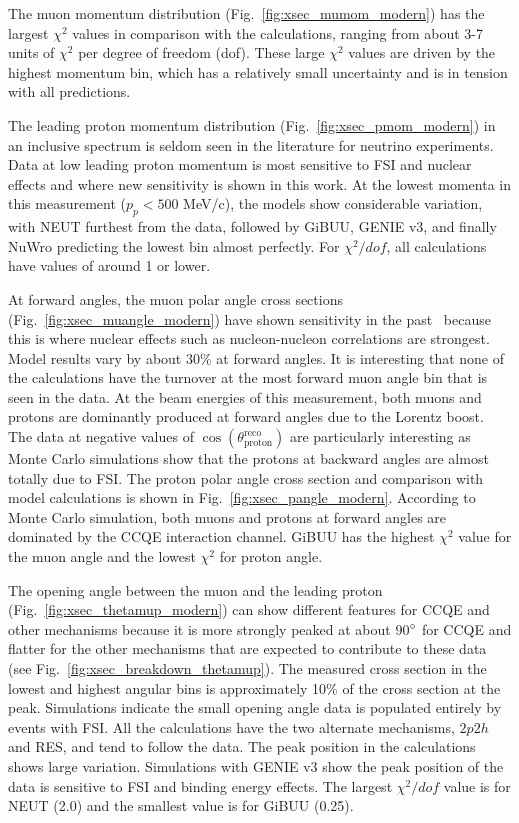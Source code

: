 \documentclass[%
twocolumn,
 amsmath,amssymb,
 aps,
prd,
superscriptaddress,showpacs]{revtex4-2}
\begin{document}
The muon momentum distribution (Fig.~\ref{fig:xsec_mumom_modern}) has the largest $\chi^2$ values in comparison with the calculations, ranging from about 3-7 units of $\chi^2$ per degree of freedom (dof).
These large $\chi^2$ values are driven by the highest momentum bin, which has a relatively small uncertainty and is in tension with all predictions.

The leading proton momentum distribution (Fig.~\ref{fig:xsec_pmom_modern}) in an inclusive spectrum is seldom seen in the literature for neutrino experiments.
Data at low leading proton momentum is most sensitive to FSI and nuclear effects and where new sensitivity is shown in this work.
At the lowest momenta in this measurement ($p_p<500$ MeV/c), the models show considerable variation, with NEUT furthest from the data, followed by GiBUU, GENIE v3, and finally NuWro predicting the lowest bin almost perfectly. 
For $\chi^2/dof$, all calculations have values of around 1 or lower.

At forward angles, the muon polar angle cross sections (Fig.~\ref{fig:xsec_muangle_modern}) have shown sensitivity in the past~\cite{Abe:2018pwo,Ruterbories:2018gub} because this is where nuclear effects such as nucleon-nucleon correlations are strongest.  
Model results vary by about 30\% at forward angles.
It is interesting that none of the calculations have the turnover at the most forward muon angle bin that is seen in the data.
At the beam energies of this measurement, both muons and protons are dominantly produced at forward angles due to the Lorentz boost.  The data at negative values of $\cos(\theta_\text{proton}^\text{reco})$ are particularly interesting as Monte Carlo simulations show that the protons at backward angles are almost totally due to FSI.  The proton polar angle cross section and comparison with model calculations is shown in Fig.~\ref{fig:xsec_pangle_modern}.  
According to Monte Carlo simulation, both muons and protons at forward angles are dominated by the CCQE interaction channel.
GiBUU has the highest $\chi^2$ value for the muon angle and the lowest $\chi^2$ for proton angle.  

The opening angle between the muon and the leading proton (Fig.~\ref{fig:xsec_thetamup_modern}) can show different features for CCQE and other mechanisms because it is more strongly peaked at about 90$\degree$ for CCQE and flatter for the other mechanisms that are expected to contribute to these data (see Fig.~\ref{fig:xsec_breakdown_thetamup}).  
The measured cross section in the lowest and highest angular bins is approximately 10\% of the cross section at the peak.
Simulations indicate the small opening angle data is populated entirely by events with FSI.
All the calculations have the two alternate mechanisms, $2p2h$ and RES, and tend to follow the data.  
The peak position in the calculations shows large variation.  Simulations with GENIE v3 show the peak position of the data is sensitive to FSI and binding energy effects.
The largest $\chi^2/dof$ value is for NEUT (2.0) and the smallest value is for GiBUU (0.25).
\end{document}
